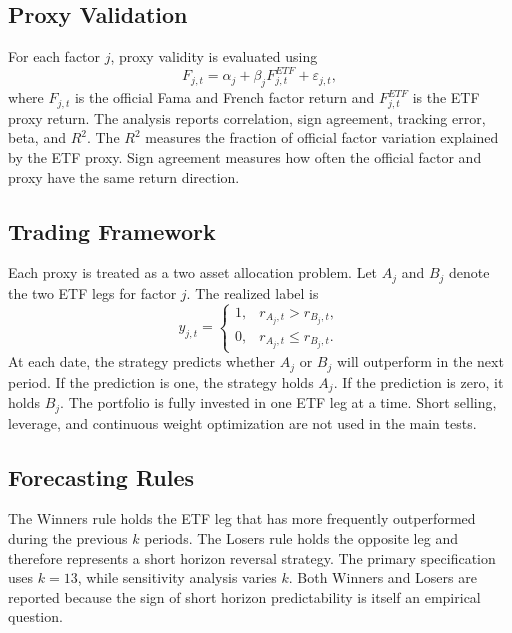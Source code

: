 \documentclass[investment,article,submit,pdftex,moreauthors]{Definitions/mdpi}
\begin{document}
\subsection{Proxy Validation}

For each factor \(j\), proxy validity is evaluated using
\begin{equation}
F_{j,t}=\alpha_j+\beta_jF^{ETF}_{j,t}+\varepsilon_{j,t},
\end{equation}
where \(F_{j,t}\) is the official Fama and French factor return and \(F^{ETF}_{j,t}\) is the ETF proxy return. The analysis reports correlation, sign agreement, tracking error, beta, and \(R^2\). The \(R^2\) measures the fraction of official factor variation explained by the ETF proxy. Sign agreement measures how often the official factor and proxy have the same return direction.

\subsection{Trading Framework}

Each proxy is treated as a two asset allocation problem. Let \(A_j\) and \(B_j\) denote the two ETF legs for factor \(j\). The realized label is
\begin{equation}
y_{j,t}=
\begin{cases}
1, & r_{A_j,t}>r_{B_j,t},\\
0, & r_{A_j,t}\leq r_{B_j,t}.
\end{cases}
\end{equation}
At each date, the strategy predicts whether \(A_j\) or \(B_j\) will outperform in the next period. If the prediction is one, the strategy holds \(A_j\). If the prediction is zero, it holds \(B_j\). The portfolio is fully invested in one ETF leg at a time. Short selling, leverage, and continuous weight optimization are not used in the main tests.

\subsection{Forecasting Rules}

The Winners rule holds the ETF leg that has more frequently outperformed during the previous \(k\) periods. The Losers rule holds the opposite leg and therefore represents a short horizon reversal strategy. The primary specification uses \(k=13\), while sensitivity analysis varies \(k\). Both Winners and Losers are reported because the sign of short horizon predictability is itself an empirical question.
\end{document}
